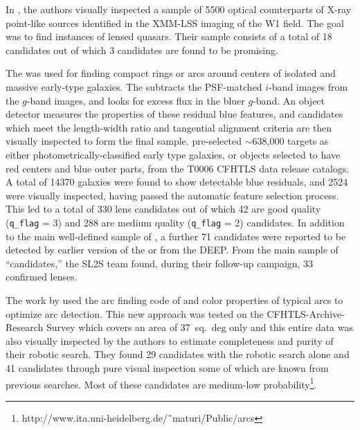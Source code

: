\documentclass[useAMS,usenatbib,a4paper]{mn2e}
\begin{document}
In \citet{Elyiv2013}, the authors visually inspected a sample of 5500 optical
counterparts of X-ray point-like sources identified in the XMM-LSS
imaging of the \cfhtls W1 field. The goal was to find instances
of lensed quasars. Their sample consists of a total of 18 candidates out
of which 3 candidates are found to be promising.

The \rf \citep{Gavazzi2014} was used for finding compact rings or arcs
around centers of isolated and massive early-type galaxies. The \rf
subtracts the PSF-matched $i$-band images from the $g$-band images, and
looks for excess flux in the bluer $g$-band. An object detector measures
the properties of these residual blue features, and candidates which
meet the length-width ratio and tangential alignment criteria are then
visually inspected to form the final sample. \citet{Gavazzi2014}
pre-selected $\sim$638,000 targets as either photometrically-classified
early type galaxies, or objects selected to have red centers and blue
outer parts, from the T0006 CFHTLS data release catalogs. A total of
14370 galaxies were found to show detectable blue residuals, and 2524
were visually inspected, having passed the automatic feature selection
process. This led to a total of 330 lens candidates out of which 42 are
good quality (\texttt{q\_flag} = 3) and 288 are medium quality
(\texttt{q\_flag} = 2) candidates. In addition to the main well-defined
sample of \citet{Gavazzi2014}, a further 71 candidates were reported to
be detected by earlier version of the \rf or from the \cfhtls DEEP.
From the main sample of ``\rf candidates,'' the SL2S team found, during
their follow-up campaign, 33 confirmed lenses.

The work by \citet{Maturi2014} used the arc finding code of
\citet{Seidel2007} and color properties of typical arcs to optimize arc
detection. This new approach was tested on the CFHTLS-Archive-Research
Survey \citep[CARS,][]{Erben2009} which covers an area of 37~sq.~deg
only and this entire data was also visually inspected by the authors to
estimate completeness and purity of their robotic search. They found 29
candidates with the robotic search alone and 41 candidates through pure
visual inspection some of which are known from previous searches. Most
of these candidates are medium-low
probability\footnote{http://www.ita.uni-heidelberg.de/˜maturi/Public/arcs}.
\end{document}

